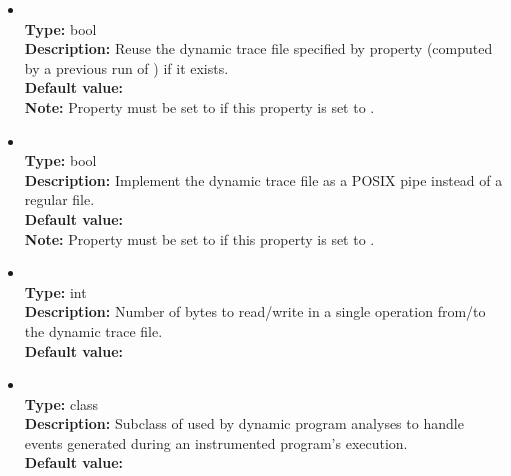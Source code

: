 \begin{itemize}
\item
{} \\
{\bf Type:} bool \\
{\bf Description:} Reuse the dynamic trace file specified by property  (computed by a previous run of \Chord) if it exists. \\
{\bf Default value:}  \\
{\bf Note:} Property  must be set to  if this property is set to .

\item
{} \\
{\bf Type:} bool \\
{\bf Description:} Implement the dynamic trace file as a POSIX pipe instead of a regular file. \\
{\bf Default value:}   \\
{\bf Note:} Property  must be set to  if this property is set to .

\item
{} \\
{\bf Type:} int \\
{\bf Description:} Number of bytes to read/write in a single operation from/to the dynamic trace file. \\
{\bf Default value:}  

\item
{} \\
{\bf Type:} class \\
{\bf Description:} Subclass of  used by dynamic program analyses to handle events generated during an instrumented program's execution. \\
{\bf Default value:}  


\end{itemize}
